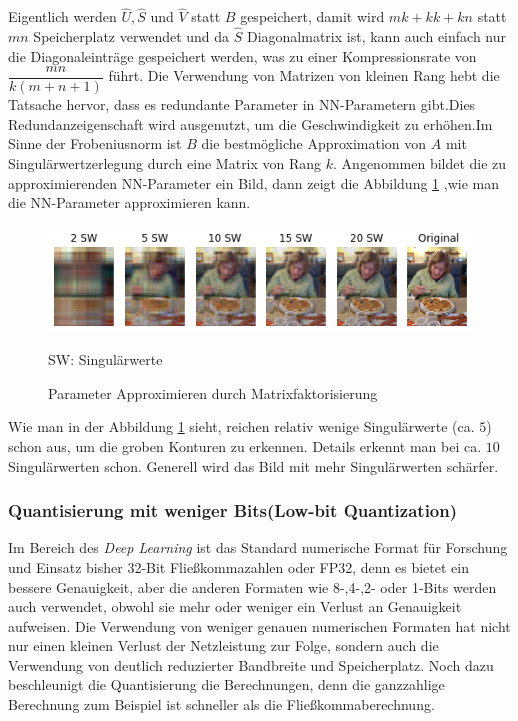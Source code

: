 \documentclass[12pt,a4paper]{scrartcl}
\numberwithin{equation}{section}
\begin{document}
Eigentlich werden $ \widehat{U} , \widehat{S} $ und $ \widehat{V} $ statt $ B $ gespeichert, damit wird $ m k + k k + k n $ statt $ mn $ Speicherplatz verwendet und da $ \widehat{S} $ Diagonalmatrix ist, kann auch einfach nur die Diagonaleinträge gespeichert werden, was zu einer Kompressionsrate von $ \dfrac{mn}{k(m+n+1)} $ führt. Die Verwendung von Matrizen von kleinen Rang hebt die Tatsache hervor, dass es redundante Parameter in \ac{NN}-Parametern gibt.Dies Redundanzeigenschaft wird ausgenutzt, um die Geschwindigkeit zu erhöhen\cite[Denton et al]{matrix quantization}.Im Sinne der Frobeniusnorm ist $ B $ die bestmögliche Approximation von $ A $ mit Singulärwertzerlegung durch eine Matrix von Rang $ k $.
Angenommen bildet die zu approximierenden NN-Parameter ein Bild, dann zeigt die Abbildung \ref{fig:matrix_fatorization} ,wie man die NN-Parameter approximieren kann.

\begin{figure}[h]
	\centering
	\includegraphics[width=\textwidth]{matrix_fatorization}
	\begin{center}
		SW: Singulärwerte
	\end{center}
	\caption{Parameter Approximieren durch Matrixfaktorisierung }
	\label{fig:matrix_fatorization}
\end{figure}
Wie man in der Abbildung \ref{fig:matrix_fatorization} sieht, reichen  relativ wenige Singulärwerte (ca. $ 5 $) schon aus, um die groben Konturen zu erkennen. Details erkennt man bei ca. $ 10 $ Singulärwerten schon. Generell wird das Bild mit mehr Singulärwerten schärfer.

\subsubsection{Quantisierung mit weniger Bits(Low-bit Quantization)}
Im Bereich des \textit{Deep Learning} ist das Standard numerische Format für Forschung und Einsatz bisher 32-Bit Fließkommazahlen oder FP32, denn es bietet ein bessere Genauigkeit, aber die anderen Formaten wie 8-,4-,2- oder 1-Bits werden auch verwendet, obwohl sie mehr oder weniger ein Verlust an Genauigkeit aufweisen.
Die Verwendung von weniger genauen numerischen Formaten hat nicht nur einen kleinen Verlust der Netzleistung zur Folge, sondern auch die Verwendung von deutlich reduzierter Bandbreite und Speicherplatz. Noch dazu beschleunigt die Quantisierung die Berechnungen, denn die ganzzahlige Berechnung zum Beispiel ist schneller als die Fließkommaberechnung.
\end{document}
